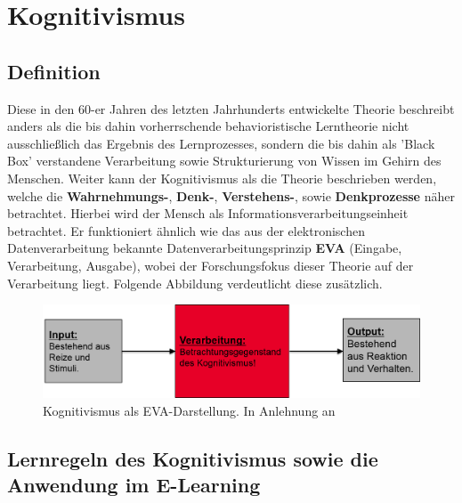 \chapter{Kognitivismus}
\label{cha:Kognitivismus}

\section{Definition}\label{Definition Kognitivismus}

Diese in den 60-er Jahren des letzten Jahrhunderts entwickelte Theorie beschreibt anders als die bis dahin vorherrschende behavioristische Lerntheorie nicht ausschließlich das Ergebnis des Lernprozesses, sondern die bis dahin als 'Black Box' verstandene Verarbeitung sowie Strukturierung von Wissen im Gehirn des Menschen. \cite[S. 155]{Erpenbeck.2007} 
Weiter kann der Kognitivismus als die Theorie beschrieben werden, welche die \textbf{Wahrnehmungs-}, \textbf{Denk-}, \textbf{Verstehens-}, sowie \textbf{Denkprozesse} näher betrachtet. Hierbei wird der Mensch als Informationsverarbeitungseinheit betrachtet. Er funktioniert ähnlich wie das aus der elektronischen Datenverarbeitung bekannte Datenverarbeitungsprinzip \textbf{EVA} (Eingabe, Verarbeitung, Ausgabe), wobei der Forschungsfokus dieser Theorie auf der Verarbeitung liegt. Folgende Abbildung verdeutlicht diese zusätzlich. \cite{AnsgarA.PlassmannProf.Dr.GunterSchmitt.2007}

\begin{figure}[h]
	\centering
	\includegraphics[width=1.0\textwidth]{Abbildungen/Kognitivismus1.PNG}
	\caption{Kognitivismus als EVA-Darstellung. In Anlehnung an \cite[S. 12]{SusanneMeir.}}
	\label{fig:Kognitivismusdarstellung}
\end{figure}

\section{Lernregeln des Kognitivismus sowie die Anwendung im E-Learning}

